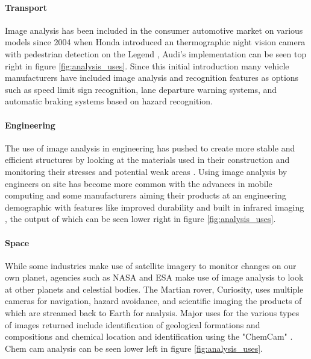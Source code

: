 	\paragraph{Transport}
	Image analysis has been included in the consumer automotive market on various models since 2004 when Honda introduced an thermographic night vision camera with pedestrian detection on the Legend  \citep{hondanightvision}, Audi's implementation can be seen top right in figure \ref{fig:analysis_uses}. Since this initial introduction many vehicle manufacturers have included image analysis and recognition features as options such as speed limit sign recognition, lane departure warning systems, and automatic braking systems based on hazard recognition.
	\paragraph{Engineering}
	The use of image analysis in engineering has pushed to create more stable and efficient structures by looking at the materials used in their construction \citep{concreteanalysis} and monitoring their stresses and potential weak areas \citep{bridgecables}. Using image analysis by engineers on site has become more common with the advances in mobile computing and some manufacturers aiming their products at an engineering demographic with features like improved durability and built in infrared imaging \citep{catphone}, the output of which can be seen lower right in figure \ref{fig:analysis_uses}.
	\paragraph{Space}
	While some industries make use of satellite imagery to monitor changes on our own planet, agencies such as NASA and ESA make use of image analysis to look at other planets and celestial bodies. The Martian rover, Curiosity, uses multiple cameras for navigation, hazard avoidance, and scientific imaging the products of which are streamed back to Earth for analysis. Major uses for the various types of images returned include identification of geological formations and compositions \citep{curiositysand, curiositygravel} and chemical location and identification using the "ChemCam" \citep{curiosityhydrogen}. Chem cam analysis can be seen lower left in figure \ref{fig:analysis_uses}.